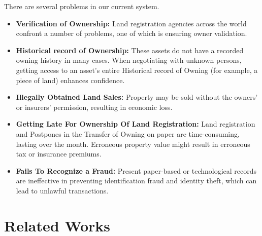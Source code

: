 \documentclass[12pt]{ucthesis}
\begin{document}
  There are several problems in our current system.
\begin{itemize}
 \item  \textbf{Verification of Ownership:} Land registration agencies across the world confront a number of problems, one of which is ensuring owner validation.
\item  \textbf{Historical record of Ownership:} These assets do not have a recorded owning history in many cases. When negotiating with unknown persons, getting access to an asset's entire Historical record of Owning (for example, a piece of land) enhances confidence.
\item  \textbf{Illegally Obtained Land Sales:}
Property may be sold without the owners' or insurers' permission, resulting in economic loss.
\item  \textbf{Getting Late For Ownership Of Land Registration:}
Land registration and Postpones in the Transfer of Owning on paper are time-consuming, lasting over the month. Erroneous property value might result in erroneous tax or insurance  premiums.
\item  \textbf{Fails To Recognize a Fraud:}  Present paper-based or technological records are ineffective in preventing identification fraud and identity theft, which can lead to unlawful transactions.
\end{itemize}
    
\section{Related Works}
\end{document}
